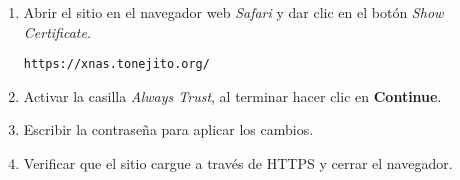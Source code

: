 {
\linespread{0.1}
\begin{enumerate}

  \item Abrir el sitio en el navegador web \textsl{Safari} y dar clic en el bot\'{o}n \textsl{Show Certificate}.

    \texttt{https://xnas.tonejito.org/}


\newpage
  \item Activar la casilla \textsl{Always Trust}, al terminar hacer clic en \textbf{Continue}.


  \item Escribir la contrase\~{n}a para aplicar los cambios.


  \item Verificar que el sitio cargue a trav\'{e}s de \textsc{HTTPS} y cerrar el navegador.


\end{enumerate}
}

